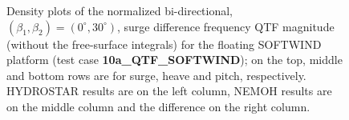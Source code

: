 \documentclass[12pt,a4paper,titlepage]{article}
\begin{document}
\begin{itemize}
\begin{figure}[h!tbp]
	\centering
{}
	\caption{Density plots of the normalized bi-directional, $(\beta_1,\beta_2)=(0^{\circ},30^{\circ})$, surge difference frequency QTF magnitude (without the free-surface integrals) for the floating SOFTWIND platform (test case \textbf{10a\_QTF\_SOFTWIND}); on the top, middle and bottom rows are for surge, heave and pitch, respectively. HYDROSTAR results are on the left column, NEMOH results are on the middle column and the difference on the right column.}\label{fig:QTFM_SOFTWIND}
\end{figure}


\end{itemize}
\end{document}
